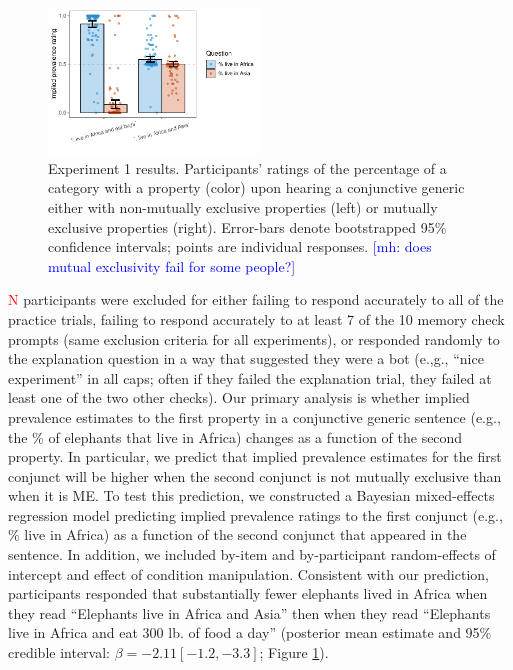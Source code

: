\documentclass[10pt,letterpaper]{article}
\newcommand{\mh}[1]{{\textcolor{Blue}{[mh: #1]}}}
\newcommand{\red}[1]{{\textcolor{Red}{#1}}}
\begin{document}
\begin{figure}[h]
  \centering
    \includegraphics[width=0.5\textwidth]{expt1_summary}
  \caption{Experiment 1 results. Participants' ratings of the percentage of a category with a property (color) upon hearing a conjunctive generic either with non-mutually exclusive properties (left) or mutually exclusive properties (right). Error-bars denote bootstrapped 95\% confidence intervals; points are individual responses. \mh{does mutual exclusivity fail for some people?}}
  \label{fig:expt1}
\end{figure}




\red{N} participants were excluded for either failing to respond accurately to all of the practice trials, failing to respond accurately to at least 7 of the 10 memory check prompts (same exclusion criteria for all experiments), or responded randomly to the explanation question in a way that suggested they were a bot (e.,g., ``nice experiment'' in all caps; often if they failed the explanation trial, they failed at least one of the two other checks). 
Our primary analysis is whether implied prevalence estimates to the first property in a conjunctive generic sentence (e.g., the \% of elephants that live in Africa) changes as a function of the second property.
In particular, we predict that implied prevalence estimates for the first conjunct will be higher when the second conjunct is not mutually exclusive than when it is ME. 
To test this prediction, we constructed a Bayesian mixed-effects regression model predicting implied prevalence ratings to the first conjunct (e.g., \% live in Africa) as a function of the second conjunct that appeared in the sentence.
In addition, we included by-item and by-participant random-effects of intercept and effect of condition manipulation.
Consistent with our prediction, participants responded that substantially fewer elephants lived in Africa when they read ``Elephants live in Africa and Asia'' then when they read ``Elephants live in Africa and eat 300 lb. of food a day'' (posterior mean estimate and 95\% credible interval: $\beta = -2.11 [-1.2, -3.3]$; Figure \ref{fig:expt1}).  
\end{document}
